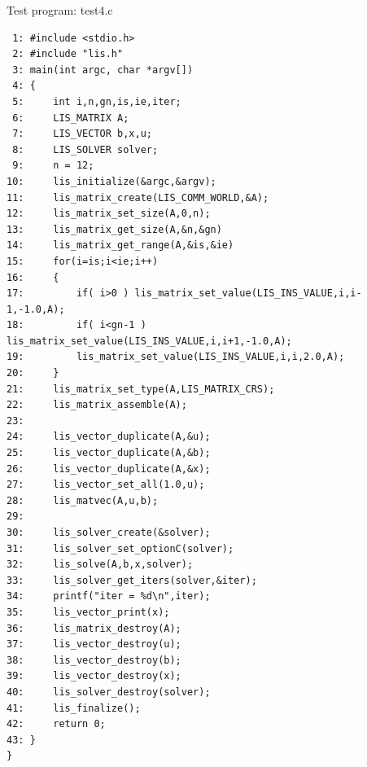 \documentclass[a4paper]{article}
\begin{document}
\begin{itembox}[l]{Test program: test4.c}
{\small
\begin{verbatim}
 1: #include <stdio.h> 
 2: #include "lis.h" 
 3: main(int argc, char *argv[]) 
 4: { 
 5:     int i,n,gn,is,ie,iter; 
 6:     LIS_MATRIX A; 
 7:     LIS_VECTOR b,x,u; 
 8:     LIS_SOLVER solver; 
 9:     n = 12; 
10:     lis_initialize(&argc,&argv); 
11:     lis_matrix_create(LIS_COMM_WORLD,&A); 
12:     lis_matrix_set_size(A,0,n); 
13:     lis_matrix_get_size(A,&n,&gn) 
14:     lis_matrix_get_range(A,&is,&ie) 
15:     for(i=is;i<ie;i++) 
16:     { 
17:         if( i>0 ) lis_matrix_set_value(LIS_INS_VALUE,i,i-1,-1.0,A); 
18:         if( i<gn-1 ) lis_matrix_set_value(LIS_INS_VALUE,i,i+1,-1.0,A); 
19:         lis_matrix_set_value(LIS_INS_VALUE,i,i,2.0,A); 
20:     } 
21:     lis_matrix_set_type(A,LIS_MATRIX_CRS); 
22:     lis_matrix_assemble(A); 
23:  
24:     lis_vector_duplicate(A,&u); 
25:     lis_vector_duplicate(A,&b); 
26:     lis_vector_duplicate(A,&x); 
27:     lis_vector_set_all(1.0,u); 
28:     lis_matvec(A,u,b); 
29:  
30:     lis_solver_create(&solver); 
31:     lis_solver_set_optionC(solver); 
32:     lis_solve(A,b,x,solver); 
33:     lis_solver_get_iters(solver,&iter); 
34:     printf("iter = %d\n",iter); 
35:     lis_vector_print(x); 
36:     lis_matrix_destroy(A); 
37:     lis_vector_destroy(u); 
38:     lis_vector_destroy(b); 
39:     lis_vector_destroy(x); 
40:     lis_solver_destroy(solver); 
41:     lis_finalize(); 
42:     return 0; 
43: } 
}
\end{verbatim}
}
\end{itembox}
\end{document}
